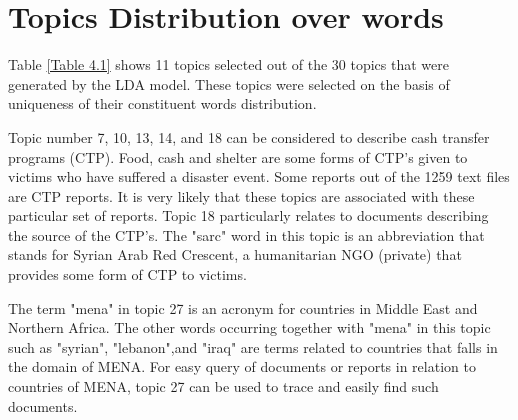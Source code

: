 \section{Topics Distribution over words}
\begin{flushleft}
Table \ref{Table 4.1} shows 11 topics selected out of the 30 topics that were generated by the  LDA model. These topics were selected on the basis of  uniqueness of their constituent words distribution.
\end{flushleft}

\begin{flushleft}
Topic number 7, 10, 13, 14, and 18 can be considered to describe cash transfer programs (CTP). Food, cash and shelter are some forms of CTP's given to victims who have suffered a disaster event. Some reports out of the 1259 text files are CTP reports. It is very likely that these topics are associated with these particular set of reports. Topic 18 particularly relates to documents describing the source of the CTP's. The "sarc" word in this topic is an abbreviation that stands for Syrian Arab Red Crescent, a humanitarian NGO (private) that provides some form of  CTP to victims.
\end{flushleft}

\begin{flushleft}
The term "mena" in topic 27 is an acronym for countries in Middle East and Northern Africa. The other words occurring together with "mena" in this topic such as "syrian", "lebanon",and "iraq" are terms related to countries that falls in the domain of MENA. For easy query of documents or reports in relation to countries of MENA, topic 27 can be used to trace and easily find such documents.
\end{flushleft}

